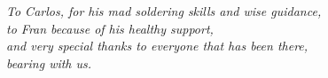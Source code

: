 	
	\cleardoublepage
	\null{}
	\begin{flushright}
		\emph{To Carlos, for his mad soldering skills and wise guidance,\\
		to Fran because of his healthy support,\\
		and very special thanks to everyone that has been there,\\
		bearing with us.}
	\end{flushright}
	\null